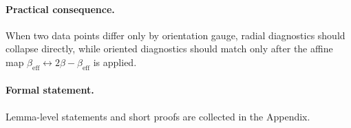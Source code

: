 \paragraph{Practical consequence.}
When two data points differ only by orientation gauge, radial diagnostics should collapse directly,
while oriented diagnostics should match only after the affine map
\(\beta_{\mathrm{eff}}\leftrightarrow 2\beta-\beta_{\mathrm{eff}}\) is applied.

\paragraph{Formal statement.}
Lemma-level statements and short proofs are collected in
the Appendix.
